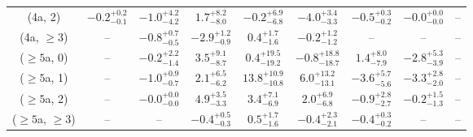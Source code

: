 \begin{table}[h!]
{\begin{tabular}{ccccccccc}
	(4a, 2) & $-0.2^{+ 0.2 }_{- 0.1 }$ & $-1.0^{+ 4.2 }_{- 4.2 }$ & $1.7^{+ 8.2 }_{- 8.0 }$ & $-0.2^{+ 6.9 }_{- 6.8 }$ & $-4.0^{+ 3.4 }_{- 3.3 }$ & $-0.5^{+ 0.3 }_{- 0.2 }$ & $-0.0^{+ 0.0 }_{- 0.0 }$ & -- \\[0.5ex] 
	(4a, $\ge3$) & -- & $-0.8^{+ 0.7 }_{- 0.5 }$ & $-2.9^{+ 1.2 }_{- 0.9 }$ & $0.4^{+ 1.7 }_{- 1.6 }$ & $-0.2^{+ 1.2 }_{- 1.2 }$ & -- & -- & -- \\[0.5ex] 
	($\ge5$a, 0) & -- & $-0.2^{+ 2.2 }_{- 1.4 }$ & $3.5^{+ 9.1 }_{- 8.7 }$ & $0.4^{+ 19.5 }_{- 19.2 }$ & $-0.8^{+ 18.8 }_{- 18.7 }$ & $1.4^{+ 8.0 }_{- 7.9 }$ & $-2.8^{+ 5.3 }_{- 3.9 }$ & -- \\[0.5ex] 
	($\ge5$a, 1) & -- & $-1.0^{+ 0.9 }_{- 0.7 }$ & $2.1^{+ 6.5 }_{- 6.2 }$ & $13.8^{+ 10.9 }_{- 10.8 }$ & $6.0^{+ 13.2 }_{- 13.1 }$ & $-3.6^{+ 5.7 }_{- 5.6 }$ & $-3.3^{+ 2.8 }_{- 2.0 }$ & -- \\[0.5ex] 
	($\ge5$a, 2) & -- & $-0.0^{+ 0.0 }_{- 0.0 }$ & $4.9^{+ 3.5 }_{- 3.3 }$ & $3.4^{+ 7.1 }_{- 6.9 }$ & $2.0^{+ 6.9 }_{- 6.8 }$ & $-0.9^{+ 2.8 }_{- 2.7 }$ & $-0.2^{+ 1.5 }_{- 1.3 }$ & -- \\[0.5ex] 
	($\ge5$a, $\ge3$) & -- & -- & $-0.4^{+ 0.5 }_{- 0.3 }$ & $0.5^{+ 1.7 }_{- 1.6 }$ & $-0.4^{+ 2.3 }_{- 2.1 }$ & $-0.4^{+ 0.3 }_{- 0.2 }$ & -- & -- \\[0.5ex] 
	\hline
	\hline
\end{tabular}}
\end{table}
